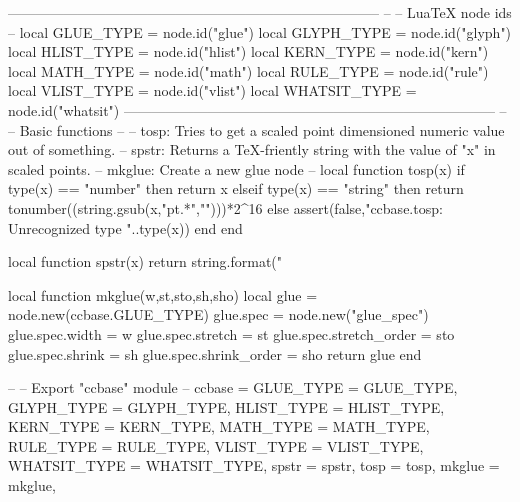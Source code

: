 \egroup
%
%
\luacode
--------------------------------------------------------------------------------
--
-- LuaTeX node ids
--
local GLUE_TYPE    = node.id("glue")
local GLYPH_TYPE   = node.id("glyph")
local HLIST_TYPE   = node.id("hlist")
local KERN_TYPE    = node.id("kern")
local MATH_TYPE    = node.id("math")
local RULE_TYPE    = node.id("rule")
local VLIST_TYPE   = node.id("vlist")
local WHATSIT_TYPE = node.id("whatsit")
--------------------------------------------------------------------------------
--
-- Basic functions
--
-- tosp: Tries to get a scaled point dimensioned numeric value out of something.
-- spstr: Returns a TeX-friently string with the value of "x" in scaled points.
-- mkglue: Create a new glue node
--
local function tosp(x)
  if type(x) == "number" then return x
  elseif type(x) == "string" then return tonumber((string.gsub(x,"pt.*","")))*2^16
  else assert(false,"ccbase.tosp: Unrecognized type "..type(x))
  end
end

local function spstr(x) return string.format("%

local function mkglue(w,st,sto,sh,sho)
  local glue = node.new(ccbase.GLUE_TYPE)
  glue.spec = node.new("glue_spec")
  glue.spec.width = w
  glue.spec.stretch = st
  glue.spec.stretch_order = sto
  glue.spec.shrink = sh
  glue.spec.shrink_order = sho
  return glue
end


--
-- Export "ccbase" module
--
ccbase = {
  GLUE_TYPE    = GLUE_TYPE,
  GLYPH_TYPE   = GLYPH_TYPE,
  HLIST_TYPE   = HLIST_TYPE,
  KERN_TYPE    = KERN_TYPE,
  MATH_TYPE    = MATH_TYPE,
  RULE_TYPE    = RULE_TYPE,
  VLIST_TYPE   = VLIST_TYPE,
  WHATSIT_TYPE = WHATSIT_TYPE,
  spstr        = spstr,
  tosp         = tosp,
  mkglue       = mkglue,
}
\endluacode
\endinput
